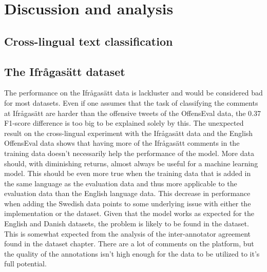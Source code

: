 \documentclass[nofilelist]{cslthse-msc}
\begin{document}

\chapter{Discussion and analysis}

\section{Cross-lingual text classification}

\section{The Ifrågasätt dataset}

The performance on the Ifrågasätt data is lackluster and would be considered bad for most datasets. Even if one assumes that the task of classifying the comments at Ifrågasätt are harder than the offensive tweets of the OffensEval data, the 0.37 F1-score difference is too big to be explained solely by this. The unexpected result on the cross-lingual experiment with the Ifrågasätt data and the English OffensEval data shows that having more of the Ifrågasätt comments in the training data doesn't necessarily help the performance of the model. 
More data should, with diminishing returns, almost always be useful for a machine learning model. This should be even more true when the training data that is added in the same language as the evaluation data and thus more applicable to the evaluation data than the English language data. This decrease in performance when adding the Swedish data points to some underlying issue with either the implementation or the dataset. Given that the model works as expected for the English and Danish datasets, the problem is likely to be found in the dataset. This is somewhat expected from the analysis of the inter-annotator agreement found in the dataset chapter. There are a lot of comments on the platform, but the quality of the annotations isn't high enough for the data to be utilized to it's full potential. 
\end{document}
